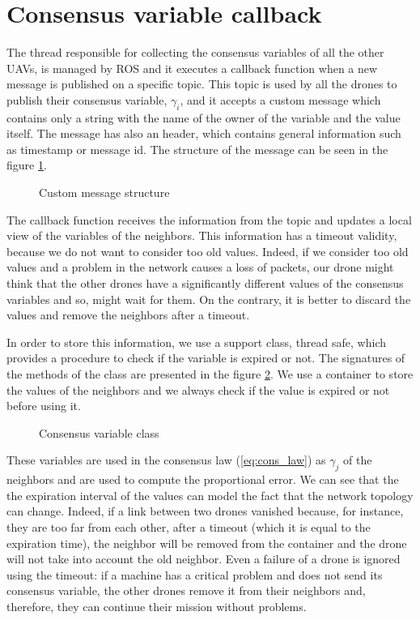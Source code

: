 \section{Consensus variable callback\label{sec:consensus_variable_callback}}

The thread responsible for collecting the consensus variables of all the other UAVs,
is managed by ROS and it executes a callback function when a new message is published
on a specific topic.
This topic is used by all the drones to publish their consensus variable, $\gamma_i$,
and it accepts a custom message which contains only a string with the name of the
owner of the variable and the value itself. The message has also an header, which contains
general information such as timestamp or message id.
The structure of the message can be seen in the figure \ref{fig:custom_message}.

\begin{figure}
\centering
  
\caption{Custom message structure}
\label{fig:custom_message}
\end{figure}

The callback function receives the information from the topic and updates a local
view of the variables of the neighbors. This information has a timeout validity,
because we do not want to consider too old values. Indeed, if we consider too old
values and a problem in the network causes a loss of packets, our drone might
think that the other drones have a significantly different values of the consensus variables
and so, might wait for them. On the contrary, it is better to discard the values and
remove the neighbors after a timeout.

In order to store this information, we use a support class, thread safe, which
provides a procedure to check if the variable is expired or not.
The signatures of the methods of the class are presented in the figure
\ref{fig:consensuss_variable_class}.
We use a container to store the values of the neighbors and we always check if the
value is expired or not before using it.

\begin{figure}
\centering
  
\caption{Consensus variable class}
\label{fig:consensuss_variable_class}
\end{figure}

These variables are used in the consensus law (\ref{eq:cons_law})
as $\gamma_j$ of the neighbors and are used to compute the proportional error.
We can see that the the expiration interval of the values can model the
fact that the network topology can change.
Indeed, if a link between two drones vanished because, for instance, they are
too far from each other, after a timeout (which it is equal to the expiration time),
the neighbor will be removed from the container and the drone will not take into
account the old neighbor.
Even a failure of a drone is ignored using the timeout: if a machine has a critical
problem and does not send its consensus variable, the other drones remove it from
their neighbors and, therefore, they can continue their mission without problems.
